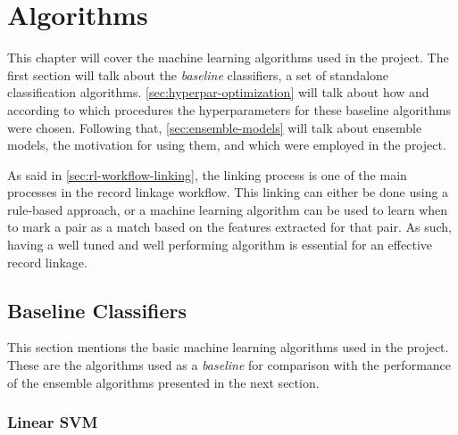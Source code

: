 \documentclass[epsfig,a4paper,11pt,titlepage,twoside,openany]{book}
\begin{document}
\chapter{Algorithms}
\label{chap:algorithms}



This chapter will cover the machine learning algorithms used in the project. The first section will talk about the \textit{baseline} classifiers, a set of standalone classification algorithms. \autoref{sec:hyperpar-optimization} will talk about how and according to which procedures the hyperparameters for these baseline algorithms were chosen. Following that, \autoref{sec:ensemble-models} will talk about ensemble models, the motivation for using them, and which were employed in the project.

As said in \autoref{sec:rl-workflow-linking}, the linking process is one of the main processes in the record linkage workflow. This linking can either be done using a rule-based approach, or a machine learning algorithm can be used to learn when to mark a pair as a match based on the features extracted for that pair. As such, having a well tuned and well performing algorithm is essential for an effective record linkage.


\section{Baseline Classifiers}
\label{sec:baseline-classifiers}

This section mentions the basic machine learning algorithms used in the project. These are the algorithms used as a \textit{baseline} for comparison with the performance of the ensemble algorithms presented in the next section. 




\subsection{Linear SVM}
\label{sec:clf-lsvm}
\end{document}
